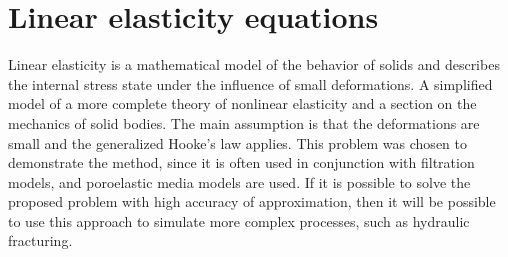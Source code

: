 \section{Linear elasticity equations}

Linear elasticity is a mathematical model of the behavior of solids and describes the internal stress state under the influence of small deformations. A simplified model of a more complete theory of nonlinear elasticity and a section on the mechanics of solid bodies. The main assumption is that the deformations are small and the generalized Hooke's law applies. This problem was chosen to demonstrate the method, since it is often used in conjunction with filtration models, and poroelastic media models are used. If it is possible to solve the proposed problem with high accuracy of approximation, then it will be possible to use this approach to simulate more complex processes, such as hydraulic fracturing.

